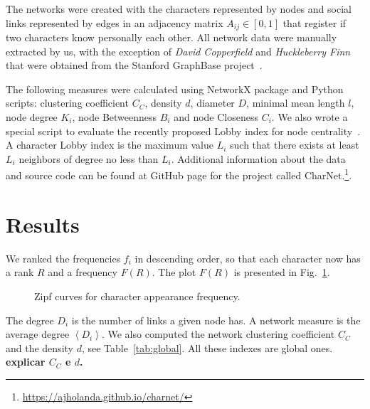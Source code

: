 \documentclass[review]{elsarticle}
\begin{document}
The networks were created with the characters represented by nodes and 
social links represented by edges in an
adjacency matrix $A_{ij} \in [0,1]$ that register if two
characters know personally each other. All network
data were manually extracted by us, with the exception of 
\emph{David Copperfield} and \emph{Huckleberry Finn} 
that were obtained from the Stanford GraphBase project~\citep{sgb}.

The following measures were calculated using NetworkX 
package and Python scripts: clustering coefficient $C_C$, 
density $d$, diameter $D$,
minimal mean length $l$, node degree $K_i$, node
Betweenness $B_i$ and node Closeness $C_i$.
We also wrote a special script to 
evaluate the recently proposed Lobby
index for node centrality~\cite{korn2009lobby,
campiteli2013lobby,lu2016h}.
A character Lobby index is the maximum value $L_i$ such that there 
exists at least $L_i$ neighbors of degree no less than  $L_i$. 
Additional information about the data and source code can be found 
at GitHub page for the project called 
CharNet.\footnote{\url{https://ajholanda.github.io/charnet/}}.

\section{Results}
\label{Results}


We ranked the frequencies $f_i$ in descending order,
so that each character now has a rank $R$ and a frequency $F(R)$.
The plot $F(R)$ is presented in Fig.~\ref{fig:zipf}.

\begin{figure}[ht]
	\centering
		\qquad
		\caption{Zipf curves for character appearance frequency.}
        \label{fig:zipf}
\end{figure}

The degree $D_i$ is the number of links a given node has. A network 
measure is the average degree $\left \langle 
D_i \right \rangle$. 
We also computed the network clustering coefficient $C_C$ and 
the density $d$, see Table~\ref{tab:global}.
All these indexes are global ones. {\bf explicar $C_C$ e $d$.}
\end{document}
